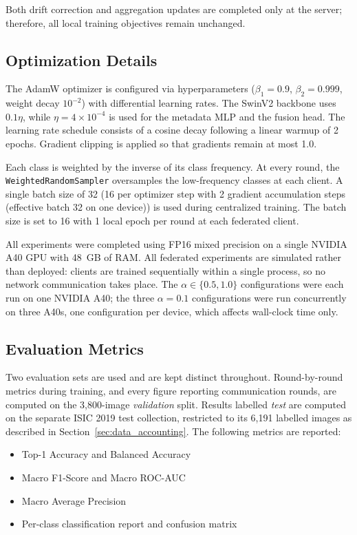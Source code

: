 \documentclass[utf8]{FrontiersinHarvard} %
\begin{document}
Both drift correction and aggregation updates are completed only at the server; therefore, all local training objectives remain unchanged.

\subsection{Optimization Details}

The AdamW optimizer is configured via hyperparameters ($\beta_1=0.9$, $\beta_2=0.999$, weight decay $10^{-2}$) with differential learning rates. The SwinV2 backbone uses $0.1\eta$, while $\eta = 4 \times 10^{-4}$ is used for the metadata MLP and the fusion head. The learning rate schedule consists of a cosine decay following a linear warmup of 2 epochs. Gradient clipping is applied so that gradients remain at most 1.0.

Each class is weighted by the inverse of its class frequency. At every round, the \texttt{WeightedRandomSampler} oversamples the low-frequency classes at each client. A single batch size of 32 (16 per optimizer step with 2 gradient accumulation steps (effective batch 32 on one device)) is used during centralized training. The batch size is set to 16 with 1 local epoch per round at each federated client.

All experiments were completed using FP16 mixed precision on a single NVIDIA A40 GPU with 48~GB of RAM. All federated experiments are simulated rather than deployed: clients are trained sequentially within a single process, so no network communication takes place. The $\alpha \in \{0.5, 1.0\}$ configurations were each run on one NVIDIA A40; the three $\alpha{=}0.1$ configurations were run concurrently on three A40s, one configuration per device, which affects wall-clock time only.

\subsection{Evaluation Metrics}

Two evaluation sets are used and are kept distinct throughout. Round-by-round metrics during training, and every figure reporting communication rounds, are computed on the 3,800-image \emph{validation} split. Results labelled \emph{test} are computed on the separate ISIC 2019 test collection, restricted to its 6,191 labelled images as described in Section~\ref{sec:data_accounting}. The following metrics are reported:
\begin{itemize}
    \item Top-1 Accuracy and Balanced Accuracy
    \item Macro F1-Score and Macro ROC-AUC
    \item Macro Average Precision
    \item Per-class classification report and confusion matrix
\end{itemize}
\end{document}
